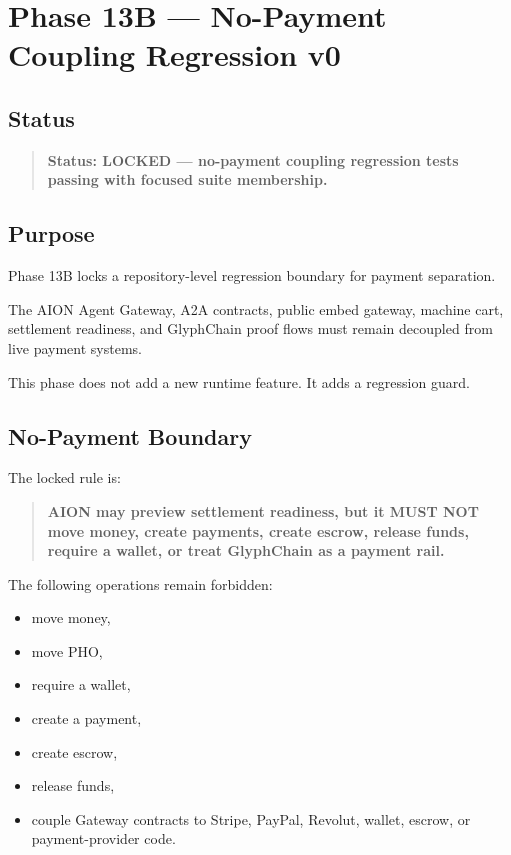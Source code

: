 \section{Phase 13B --- No-Payment Coupling Regression v0}
\label{sec:aion-phase13-no-payment-coupling-regression-v0}

\subsection{Status}

\begin{quote}
\textbf{Status: LOCKED --- no-payment coupling regression tests passing with focused suite membership.}
\end{quote}

\subsection{Purpose}

Phase 13B locks a repository-level regression boundary for payment separation.

The AION Agent Gateway, A2A contracts, public embed gateway, machine cart, settlement readiness, and GlyphChain proof flows must remain decoupled from live payment systems.

This phase does not add a new runtime feature. It adds a regression guard.

\subsection{No-Payment Boundary}

The locked rule is:

\begin{quote}
\textbf{AION may preview settlement readiness, but it MUST NOT move money, create payments, create escrow, release funds, require a wallet, or treat GlyphChain as a payment rail.}
\end{quote}

The following operations remain forbidden:

\begin{itemize}
  \item move money,
  \item move PHO,
  \item require a wallet,
  \item create a payment,
  \item create escrow,
  \item release funds,
  \item couple Gateway contracts to Stripe, PayPal, Revolut, wallet, escrow, or payment-provider code.
\end{itemize}

